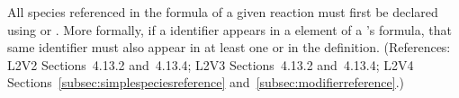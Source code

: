 All species referenced in the \StoichiometryMath formula of a given
reaction must first be declared using \SpeciesReference or
\ModifierSpeciesReference.  More formally, if a \Species identifier appears
in a  element of a \Reaction's \StoichiometryMath formula, that
same identifier must also appear in at least one \SpeciesReference or
\ModifierSpeciesReference in the \Reaction definition.  (References: L2V2
Sections~4.13.2 and~4.13.4; L2V3 Sections~4.13.2 and~4.13.4; L2V4 Sections~\ref{subsec:simplespeciesreference}
and~\ref{subsec:modifierreference}.)
